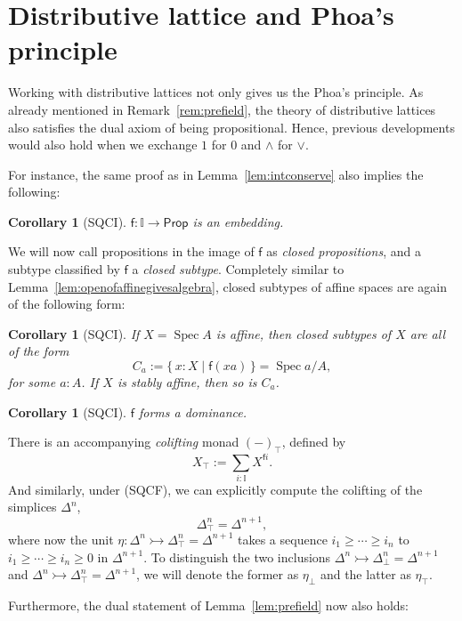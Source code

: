 \documentclass[12pt]{amsart}
\newtheorem{corollary}[theorem]{Corollary}
\theoremstyle{definition}
\newcommand{\mbb}[1]{\mathbb{#1}}
\newcommand{\I}{\mbb I}
\newcommand{\ms}[1]{\mathsf{#1}}
\newcommand{\scomp}[2]{\{\,#1\mid#2\,\}}
\newcommand{\inj}{\rightarrowtail}
\newcommand{\prt}{_{\bot}}
\newcommand{\cprt}{_{\top}}
\newcommand{\pp}{\ms{Prop}}
\newcommand{\spec}{\operatorname{Spec}}
\begin{document}
\section{Distributive lattice and Phoa's principle}\label{sec:distphoa}

Working with distributive lattices not only gives us the Phoa's principle. As already mentioned in Remark~\ref{rem:prefield}, the theory of distributive lattices also satisfies the dual axiom of being propositional. Hence, previous developments would also hold when we exchange $1$ for $0$ and $\wedge$ for $\vee$.

For instance, the same proof as in Lemma~\ref{lem:intconserve} also implies the following:

\begin{corollary}[SQCI]
  $\ms f : \I \to \pp$ is an embedding.
\end{corollary}

We will now call propositions in the image of $\ms f$ as \emph{closed propositions}, and a subtype classified by $\ms f$ a \emph{closed subtype}. Completely similar to Lemma~\ref{lem:openofaffinegivesalgebra}, closed subtypes of affine spaces are again of the following form:

\begin{corollary}[SQCI]\label{cor:closedaffinealgebra}
  If $X = \spec A$ is affine, then closed subtypes of $X$ are all of the form
  \[ C_a := \scomp{x : X}{\ms f(xa)} = \spec a/A, \]
  for some $a:A$. If $X$ is stably affine, then so is $C_a$.
\end{corollary}

\begin{corollary}[SQCI]
  $\ms f$ forms a dominance.
\end{corollary}

There is an accompanying \emph{colifting} monad $(-)\cprt$, defined by
\[ X\cprt := \sum_{i:\I} X^{\ms fi}. \]
And similarly, under (SQCF), we can explicitly compute the colifting of the simplices $\Delta^n$,
\[ \Delta^n\cprt = \Delta^{n+1}, \]
where now the unit $\eta : \Delta^n \inj \Delta^n\cprt = \Delta^{n+1}$ takes a sequence $i_1 \ge \cdots \ge i_n$ to $i_1 \ge \cdots \ge i_n \ge 0$ in $\Delta^{n+1}$. To distinguish the two inclusions $\Delta^n \inj \Delta^n\prt = \Delta^{n+1}$ and $\Delta^n \inj \Delta^{n}\cprt = \Delta^{n+1}$, we will denote the former as $\eta\prt$ and the latter as $\eta\cprt$.

Furthermore, the dual statement of Lemma~\ref{lem:prefield} now also holds:
\end{document}
